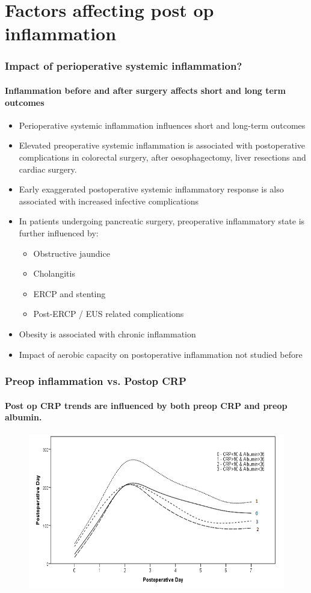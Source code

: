 \documentclass[10pt]{beamer}
\begin{document}
\section[Chapter 5]{Factors affecting post op inflammation}

\begin{frame}
	\frametitle{Impact of perioperative systemic inflammation?}
	\framesubtitle{Inflammation before and after surgery affects short and long term outcomes}
	\begin{itemize}
		\item Perioperative systemic inflammation influences short and long-term outcomes
		\item Elevated preoperative systemic inflammation is associated with postoperative complications in colorectal surgery, after oesophagectomy, liver resections and cardiac surgery. 
		\item Early exaggerated postoperative systemic inflammatory response is also associated with increased infective complications
		\item In patients undergoing pancreatic surgery, preoperative inflammatory state is further influenced by:
		\begin{itemize}
			\item Obstructive jaundice
			\item Cholangitis
			\item ERCP and stenting
			\item Post-ERCP / EUS related complications
		\end{itemize}
		\item Obesity is associated with chronic inflammation
		\item Impact of aerobic capacity on postoperative inflammation not studied before
	\end{itemize}
\end{frame}


\begin{frame}
	\frametitle{Preop inflammation vs. Postop CRP}
	\framesubtitle{Post op CRP trends are influenced by both preop CRP and preop albumin.}
	\begin{figure}
		\includegraphics[width=\textwidth]{../Figures/sirs_crp_crp_alb}
	\end{figure}
\end{frame}
\end{document}
